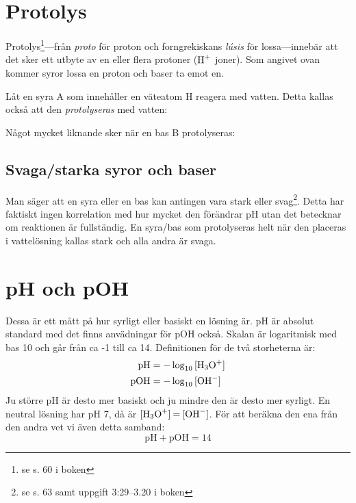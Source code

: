 \section{Protolys}

Protolys\footnote{se s. 60 i boken}---från \emph{proto} för proton och forngrekiskans \emph{lúsis} för lossa---innebär att det sker ett utbyte av en eller flera protoner ($\ce{H+}$ joner). Som angivet ovan kommer syror lossa en proton och baser ta emot en.
\begin{exm}
    Låt en syra A som innehåller en väteatom H reagera med vatten. Detta kallas också att den \emph{protolyseras} med vatten:
    \begin{center}
    \end{center}
    Något mycket liknande sker när en bas B protolyseras:
    \begin{center}
    \end{center}
\end{exm}

\subsection{Svaga/starka syror och baser}
Man säger att en syra eller en bas kan antingen vara stark eller svag\footnote{se s. 63 samt uppgift 3:29--3.20 i boken}. Detta har faktiskt ingen korrelation med hur mycket den förändrar pH utan det betecknar om reaktionen är fullständig. En syra/bas som protolyseras helt när den placeras i vattelösning kallas stark och alla andra är svaga.

\section{pH och pOH}

Dessa är ett mått på hur syrligt eller basiskt en lösning är. pH är absolut standard med det finns anvädningar för pOH också. Skalan är logaritmisk med bas 10 och går från ca -1 till ca 14. Definitionen för de två storheterna är:
\begin{align*}
    \mathrm{pH} &= -\log_{10}{\ce{[H3O+]}} \\
    \mathrm{pOH} &= -\log_{10}{\ce{[OH^-]}}
\end{align*}
Ju större pH är desto mer basiskt och ju mindre den är desto mer syrligt. En neutral lösning har pH 7, då är $\ce{[H3O+] = [OH^-]}$. För att beräkna den ena från den andra vet vi även detta samband:
\[
    \mathrm{pH + pOH} = 14
\]

